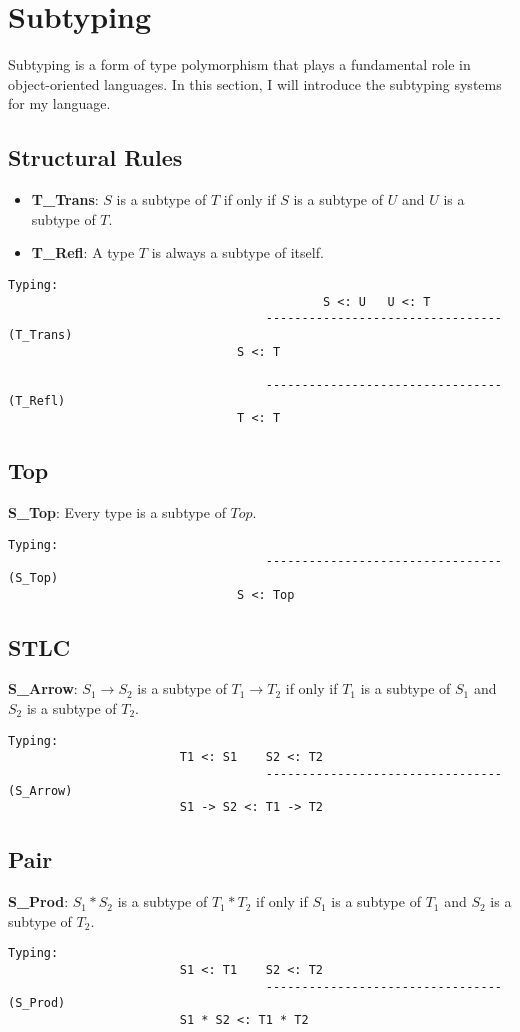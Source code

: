 \section{Subtyping}
\label{sec:type}
Subtyping is a form of type polymorphism that plays a fundamental role in object-oriented languages. In this section, I will introduce the subtyping systems for my language.

\subsection{Structural Rules}
\begin{itemize}
    \item \textbf{T_Trans}: $S$ is a subtype of $T$ if only if $S$ is a subtype of $U$ and $U$ is a subtype of $T$.
    \item \textbf{T_Refl}: A type $T$ is always a subtype of itself.
\end{itemize}
\begin{lstlisting}
Typing:
									        S <: U   U <: T
									---------------------------------   (T_Trans)
                                S <: T

									---------------------------------   (T_Refl)
                                T <: T
\end{lstlisting}

\subsection{Top}
\textbf{S_Top}: Every type is a subtype of $Top$. 
\begin{lstlisting}
Typing:
									---------------------------------   (S_Top)
                                S <: Top
\end{lstlisting}


\subsection{STLC}
\textbf{S_Arrow}: $S_1 \rightarrow S_2$ is a subtype of $T_1 \rightarrow T_2$ if only if $T_1$ is a subtype of $S_1$ and $S_2$ is a subtype of $T_2$. 
\begin{lstlisting}
Typing:
                        T1 <: S1    S2 <: T2
									---------------------------------   (S_Arrow)
                        S1 -> S2 <: T1 -> T2
\end{lstlisting}

\subsection{Pair}
\textbf{S_Prod}: $S_1 * S_2$ is a subtype of $T_1 * T_2$ if only if $S_1$ is a subtype of $T_1$ and $S_2$ is a subtype of $T_2$.
\begin{lstlisting}
Typing:
                        S1 <: T1    S2 <: T2
									---------------------------------   (S_Prod)
                        S1 * S2 <: T1 * T2
\end{lstlisting}

